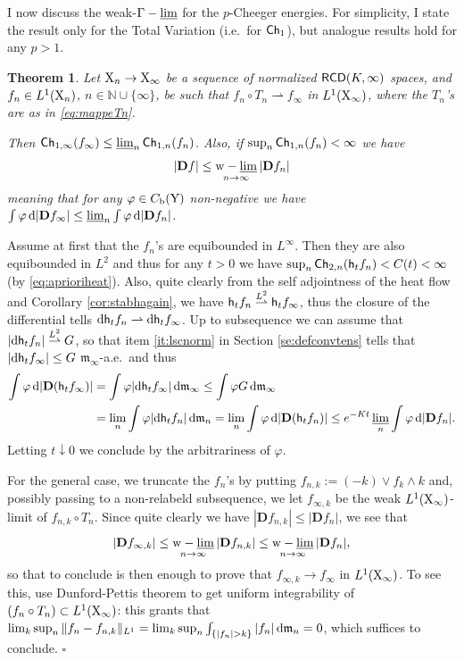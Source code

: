 \documentclass[11pt]{article}
\numberwithin{equation}{section}
\newtheorem{theorem}{Theorem}[section]
\newenvironment{idea}{\removelastskip\par\medskip   %
\noindent{\em Idea of the proof} \rm}{\penalty-20\null\hfill$\square$\par\medbreak}
\newcommand{\N}{\mathbb{N}}
\newcommand{\X}{{\rm X}}
\newcommand{\Y}{{\rm Y}}
\newcommand{\mm}{{\mathfrak m}}
\newcommand{\RCD}{{\sf RCD}}
\newcommand{\ch}{{\sf Ch}}
\renewcommand{\d}{{\rm d}}
\newcommand{\limi}{\varliminf}
\renewcommand{\b}{{\rm b}}
\newcommand{\weakto}{\rightharpoonup}
\newcommand{\h}{{\sf h}} %
\newcommand{\DD}{\mathbf D}
\DeclareMathOperator*{\glimi}{{\Gamma-\limi}}
\DeclareMathOperator*{\wlimi}{{\rm w}-\limi}
\begin{document}
I now discuss the weak-$\glimi$ for the $p$-Cheeger energies. For simplicity, I state the result only for the Total Variation (i.e.\ for $\ch_1$), but analogue results hold for any $p>1$.
\begin{theorem}\label{thm:stabtv} Let $\X_n\to\X_\infty$ be a sequence of normalized $\RCD(K,\infty)$ spaces, and $f_n\in L^1(\X_n)$, $n\in\N\cup\{\infty\}$, be such that $f_n\circ T_n\weakto f_\infty$ in $L^1(\X_\infty)$, where the $T_n$'s are as in \eqref{eq:mappeTn}.

Then $\ch_{1,\infty}(f_\infty)\leq\limi_n\ch_{1,n}(f_n)$. Also, if $\sup_n\ch_{1,n}(f_n)<\infty$ we have
\[
|\DD f|\leq\wlimi_{n\to\infty}|\DD f_n|
\]
meaning that for any $\varphi\in C_\b(\Y)$ non-negative we have $\int\varphi\,\d |\DD f_\infty|\leq\limi_n\int\varphi\,\d |\DD f_n|$.
\end{theorem}
\begin{idea} Assume at first that the $f_n$'s are equibounded in $L^\infty$. Then they are also equibounded in $L^2$ and thus for any $t>0$ we have $\sup_n\ch_{2,n}(\h_tf_n)<C(t)<\infty$ (by \eqref{eq:aprioriheat}). Also, quite clearly from the self adjointness of the heat flow and Corollary \ref{cor:stabhagain}, we have $\h_tf_n\stackrel{L^2}\weakto\h_tf_\infty$, thus  the closure of the differential tells $\d\h_tf_n\weakto \d\h_tf_\infty$. Up to subsequence we can assume that  $|\d\h_tf_n|\stackrel{L^2}\weakto G$, so that item \ref{it:lscnorm} in Section \ref{se:defconvtens} tells that $|\d \h_tf_\infty|\leq G$ $\mm_\infty$-a.e.\ and thus
\[
\begin{split}
\int \varphi\,\d|\DD(\h_tf_\infty)|&=\int \varphi|\d\h_tf_\infty|\,\d\mm_\infty\leq\int \varphi G\,\d\mm_\infty \\&= \lim_n\int \varphi|\d\h_tf_n|\,\d\mm_n= \lim_n\int \varphi\,\d|\DD(\h_tf_n)|\stackrel{}\leq e^{-Kt}\limi_n\int \varphi\,\d|\DD f_n|.
\end{split}
\]
Letting $t\downarrow0$ we conclude by the arbitrariness of $\varphi$.

For the general case, we truncate the $f_n$'s by putting $f_{n,k}:=(-k)\vee f_k\wedge k$ and, possibly passing to a non-relabeld subsequence, we let $f_{\infty,k}$ be the weak $L^1(\X_\infty)$-limit of $f_{n,k}\circ T_n$. Since quite clearly we have $|\DD f_{n,k}|\leq |\DD f_n|$, we see that 
\[
|\DD f_{\infty,k}|\leq \wlimi_{n\to\infty}|\DD f_{n,k}|\leq \wlimi_{n\to\infty}|\DD f_n|,
\]
so that to conclude is then enough to prove that $f_{\infty,k}\to f_\infty$ in $L^1(\X_\infty)$. To see this, use Dunford-Pettis theorem to get uniform integrability of $(f_n\circ T_n)\subset L^1(\X_\infty)$: this grants that $\lim_k\sup_n\|f_n-f_{n,k}\|_{L^1}=\lim_k\sup_n\int_{\{|f_n|>k\}}|f_n|\,\d\mm_n=0$, which suffices to conclude.
\end{idea}
\end{document}
